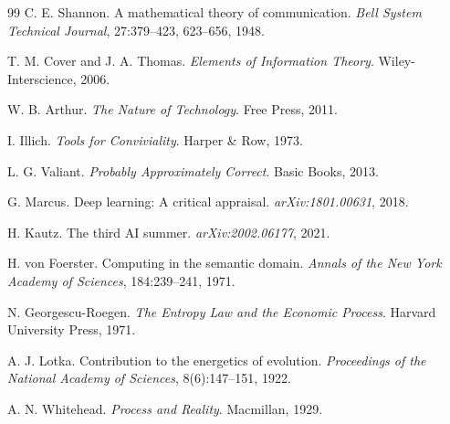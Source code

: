 \documentclass[12pt,oneside]{book}
\begin{document}
\begin{thebibliography}{99}
C. E. Shannon.
\newblock A mathematical theory of communication.
\newblock \emph{Bell System Technical Journal}, 27:379--423, 623--656, 1948.

T. M. Cover and J. A. Thomas.
\newblock \emph{Elements of Information Theory}.
\newblock Wiley-Interscience, 2006.

W. B. Arthur.
\newblock \emph{The Nature of Technology}.
\newblock Free Press, 2011.

I. Illich.
\newblock \emph{Tools for Conviviality}.
\newblock Harper \& Row, 1973.

L. G. Valiant.
\newblock \emph{Probably Approximately Correct}.
\newblock Basic Books, 2013.

G. Marcus.
\newblock Deep learning: A critical appraisal.
\newblock \emph{arXiv:1801.00631}, 2018.

H. Kautz.
\newblock The third AI summer.
\newblock \emph{arXiv:2002.06177}, 2021.

H. von Foerster.
\newblock Computing in the semantic domain.
\newblock \emph{Annals of the New York Academy of Sciences}, 184:239--241, 1971.

N. Georgescu-Roegen.
\newblock \emph{The Entropy Law and the Economic Process}.
\newblock Harvard University Press, 1971.

A. J. Lotka.
\newblock Contribution to the energetics of evolution.
\newblock \emph{Proceedings of the National Academy of Sciences}, 8(6):147--151, 1922.

A. N. Whitehead.
\newblock \emph{Process and Reality}.
\newblock Macmillan, 1929.

\end{thebibliography}
\end{document}
